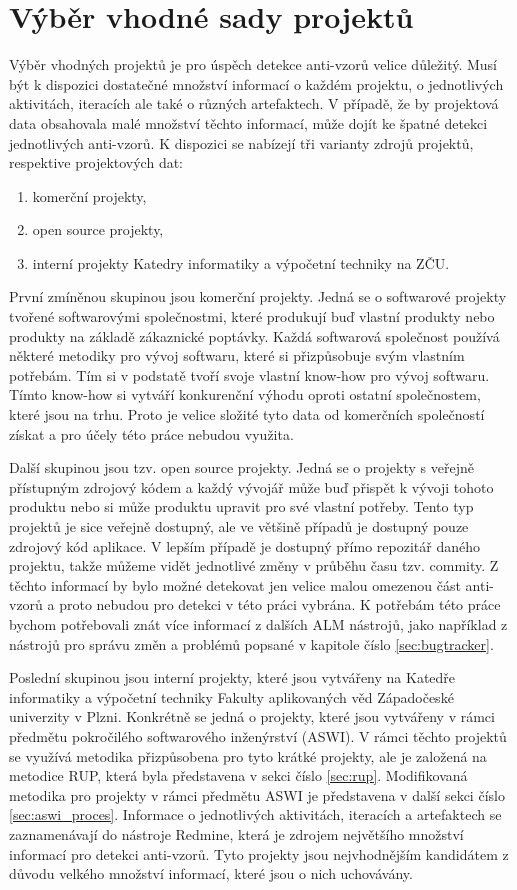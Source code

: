 \documentclass[czech,DP]{thesiskiv}
\begin{document}
\section{Výběr vhodné sady projektů}
Výběr vhodných projektů je pro úspěch detekce anti-vzorů velice důležitý. Musí být k dispozici dostatečné množství informací o každém projektu, o jednotlivých aktivitách, iteracích ale také o různých artefaktech. V případě, že by projektová data obsahovala malé množství těchto informací, může dojít ke špatné detekci jednotlivých anti-vzorů. K dispozici se nabízejí tři varianty zdrojů projektů, respektive projektových dat:
\begin{enumerate}
    \item komerční projekty,
    \item open source projekty,
    \item interní projekty Katedry informatiky a výpočetní techniky na ZČU.
\end{enumerate}
První zmíněnou skupinou jsou komerční projekty. Jedná se o softwarové projekty tvořené softwarovými společnostmi, které produkují buď vlastní produkty nebo produkty na základě zákaznické poptávky. Každá softwarová společnost používá některé metodiky pro vývoj softwaru, které si přizpůsobuje svým vlastním potřebám. Tím si v podstatě tvoří svoje vlastní know-how pro vývoj softwaru. Tímto know-how si vytváří konkurenční výhodu oproti ostatní společnostem, které jsou na trhu. Proto je velice složité tyto data od komerčních společností získat a pro účely této práce nebudou využita.
\par
Další skupinou jsou tzv. open source projekty. Jedná se o projekty s veřejně přístupným zdrojový kódem a každý vývojář může buď přispět k vývoji tohoto produktu nebo si může produktu upravit pro své vlastní potřeby. Tento typ projektů je sice veřejně dostupný, ale ve většině případů je dostupný pouze zdrojový kód aplikace. V lepším případě je dostupný přímo repozitář daného projektu, takže můžeme vidět jednotlivé změny v průběhu času tzv. commity. Z těchto informací by bylo možné detekovat jen velice malou omezenou část anti-vzorů a proto nebudou pro detekci v této práci vybrána. K potřebám této práce bychom potřebovali znát více informací z dalších ALM nástrojů, jako například z nástrojů pro správu změn a problémů popsané v kapitole číslo \ref{sec:bugtracker}.
\par
Poslední skupinou jsou interní projekty, které jsou vytvářeny na Katedře informatiky a výpočetní techniky Fakulty aplikovaných věd Západočeské univerzity v Plzni. Konkrétně se jedná o projekty, které jsou vytvářeny v rámci předmětu pokročilého softwarového inženýrství (ASWI). V rámci těchto projektů se využívá metodika přizpůsobena pro tyto krátké projekty, ale je založená na metodice RUP, která byla představena v sekci číslo \ref{sec:rup}. Modifikovaná metodika pro projekty v rámci předmětu ASWI je představena v další sekci číslo \ref{sec:aswi_proces}. Informace o jednotlivých aktivitách, iteracích a artefaktech se zaznamenávají do nástroje Redmine, která je zdrojem největšího množství informací pro detekci anti-vzorů. Tyto projekty jsou nejvhodnějším kandidátem z důvodu velkého množství informací, které jsou o nich uchovávány. 
\end{document}
